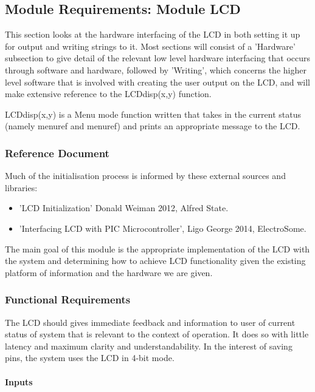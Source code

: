 \documentclass{article}
\begin{document}
\subsection{Module Requirements: Module LCD}
This section looks at the hardware interfacing of the LCD in both setting it up for output and writing strings to it. Most sections will consist of a 'Hardware' subsection to give detail of the relevant low level hardware interfacing that occurs through software and hardware, followed by 'Writing', which concerns the higher level software that is involved with creating the user output on the LCD, and will make extensive reference to the LCD\textunderscore disp(x,y) function.

LCD\textunderscore disp(x,y) is a Menu mode function written that takes in the current status (namely menu\textunderscore ref and menu\textunderscore ref) and prints an appropriate message to the LCD.

\subsubsection{Reference Document}
Much of the initialisation process is informed by these external sources and libraries:
\begin{itemize}
	\item 'LCD Initialization' Donald Weiman 2012, Alfred State.
	\item 'Interfacing LCD with PIC Microcontroller', Ligo George 2014, ElectroSome.
\end{itemize}

The main goal of this module is the appropriate implementation of the LCD with the system and determining how to achieve LCD functionality given the existing platform of information and the hardware we are given.
\subsubsection{Functional Requirements}
The LCD should gives immediate feedback and information to user of current status of system that is relevant to the context of operation. It does so with little latency and maximum clarity and understandability. In the interest of saving pins, the system uses the LCD in 4-bit mode.

\paragraph{Inputs}
\end{document}
